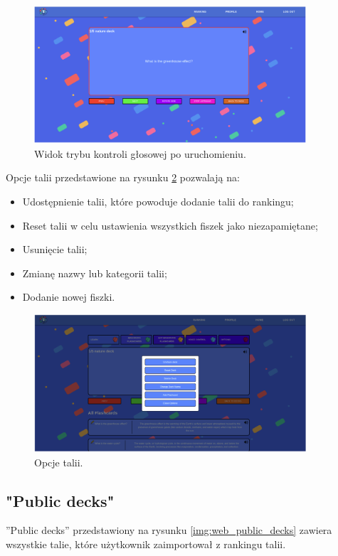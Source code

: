\begin{figure}[H]
    \centering
    \includegraphics[width=0.9\textwidth]{chapters/chapter_10/images_web/web_voice_2}
    \caption{Widok trybu kontroli głosowej po uruchomieniu.}
    \label{img:web_voice_2}
\end{figure}

Opcje talii przedstawione na rysunku \ref{img:web_settings} pozwalają na:
\begin{itemize}
    \item Udostępnienie talii, które powoduje dodanie talii do rankingu;
    \item Reset talii w celu ustawienia wszystkich fiszek jako niezapamiętane;
    \item Usunięcie talii;
    \item Zmianę nazwy lub kategorii talii;
    \item Dodanie nowej fiszki.
\end{itemize}

\begin{figure}[H]
    \centering
    \includegraphics[width=0.9\textwidth]{chapters/chapter_10/images_web/web_settings}
    \caption{Opcje talii.}
    \label{img:web_settings}
\end{figure}


\subsection{"Public decks"}
”Public decks” przedstawiony na rysunku \ref{img:web_public_decks} zawiera wszystkie talie, które użytkownik zaimportował z rankingu talii.



